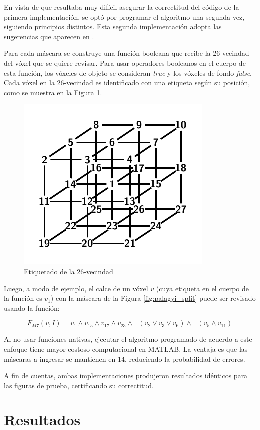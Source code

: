 En vista de que resultaba muy difícil asegurar la correctitud del código de la primera implementación, se optó por programar el algoritmo una segunda vez, siguiendo principios distintos. Esta segunda implementación adopta las sugerencias que aparecen en \cite{palagyi1999parallel}.

Para cada máscara se construye una función booleana que recibe la 26-vecindad del vóxel que se quiere revisar. Para usar operadores booleanos en el cuerpo de esta función, los vóxeles de objeto se consideran \textit{true} y los vóxeles de fondo \textit{false}. Cada vóxel en la 26-vecindad es identificado con una etiqueta según su posición, como se muestra en la Figura \ref{fig:palagyi_numbers}.

\begin{figure}[H]\centering
\includegraphics[width=0.4\linewidth]{images/palagyi_numbers}
\caption{Etiquetado de la 26-vecindad}
\label{fig:palagyi_numbers}
\end{figure}

Luego, a modo de ejemplo, el calce de un vóxel $v$ (cuya etiqueta en el cuerpo de la función es $v_1$) con la máscara de la Figura \ref{fig:palagyi_split} puede ser revisado usando la función:

\begin{equation*}
F_{M7}(v, I) = v_1 \land v_{15} \land v_{17} \land v_{23} \land \neg(v_2 \lor v_3 \lor v_6) \land \neg(v_5 \land v_{11})
\end{equation*}

Al no usar funciones nativas, ejecutar el algoritmo programado de acuerdo a este enfoque tiene mayor costoso computacional en MATLAB. La ventaja es que las máscaras a ingresar se mantienen en 14, reduciendo la probabilidad de errores.

A fin de cuentas, ambas implementaciones produjeron resultados idénticos para las figuras de prueba, certificando su correctitud.

\section{Resultados}

